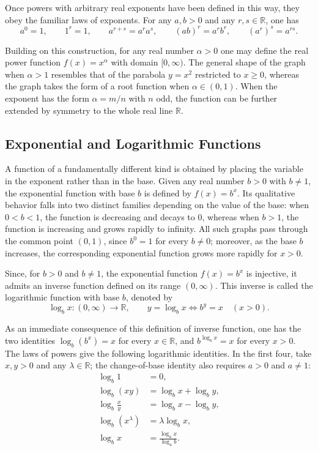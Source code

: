 Once powers with arbitrary real exponents have been defined in this way, they obey the familiar laws of exponents. For any $a, b > 0$ and any $r, s \in \mathbb{R}$, one has
\[
a^0 = 1, \qquad 1^r = 1, \qquad a^{r+s} = a^r a^s, \qquad (ab)^r = a^r b^r, \qquad (a^r)^s = a^{rs}.
\]

Building on this construction, for any real number $\alpha > 0$ one may define the real power function $f(x) = x^\alpha$ with domain $[0, \infty)$. The general shape of the graph when $\alpha > 1$ resembles that of the parabola $y = x^2$ restricted to $x \geq 0$, whereas the graph takes the form of a root function when $\alpha \in (0,1)$. When the exponent has the form $\alpha = m/n$ with $n$ odd, the function can be further extended by symmetry to the whole real line $\mathbb{R}$.

\subsection{Exponential and Logarithmic Functions}

A function of a fundamentally different kind is obtained by placing the variable in the exponent rather than in the base. Given any real number $b > 0$ with $b \neq 1$, the exponential function with base $b$ is defined by $f(x) = b^x$. Its qualitative behavior falls into two distinct families depending on the value of the base: when $0 < b < 1$, the function is decreasing and decays to $0$, whereas when $b > 1$, the function is increasing and grows rapidly to infinity. All such graphs pass through the common point $(0,1)$, since $b^0 = 1$ for every $b \neq 0$; moreover, as the base $b$ increases, the corresponding exponential function grows more rapidly for $x > 0$.

Since, for $b > 0$ and $b \neq 1$, the exponential function $f(x) = b^x$ is injective, it admits an inverse function defined on its range $(0, \infty)$. This inverse is called the logarithmic function with base $b$, denoted by
\[
\log_b x : (0, \infty) \to \mathbb{R}, \qquad y = \log_b x \iff b^y = x \quad (x > 0).
\]

As an immediate consequence of this definition of inverse function, one has the two identities $\log_b(b^x) = x$ for every $x \in \mathbb{R}$, and $b^{\log_b x} = x$ for every $x > 0$. The laws of powers give the following logarithmic identities. In the first four, take $x, y > 0$ and any $\lambda \in \mathbb{R}$; the change-of-base identity also requires $a > 0$ and $a \neq 1$:
\[
\begin{aligned}
\log_b 1 &= 0, \\
\log_b(xy) &= \log_b x + \log_b y, \\
\log_b \frac{x}{y} &= \log_b x - \log_b y, \\
\log_b(x^\lambda) &= \lambda \log_b x, \\
\log_b x &= \frac{\log_a x}{\log_a b}.
\end{aligned}
\]


